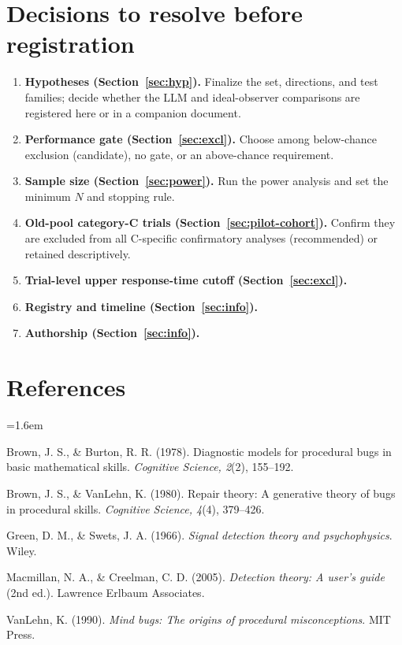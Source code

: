 \documentclass[11pt]{article}
\begin{document}
\section{Decisions to resolve before registration}\label{sec:decisions}

\begin{tcolorbox}[colback=decisioncol!5,colframe=decisioncol!55,boxrule=0.8pt,
  left=10pt,right=10pt,top=8pt,bottom=8pt]
\small
\begin{enumerate}[leftmargin=1.5em,label=\arabic*.]
\item \textbf{Hypotheses (Section~\ref{sec:hyp}).} Finalize the set, directions, and test
families; decide whether the LLM and ideal-observer comparisons are registered here or in a
companion document.
\item \textbf{Performance gate (Section~\ref{sec:excl}).} Choose among below-chance exclusion
(candidate), no gate, or an above-chance requirement.
\item \textbf{Sample size (Section~\ref{sec:power}).} Run the power analysis and set the
minimum $N$ and stopping rule.
\item \textbf{Old-pool category-C trials (Section~\ref{sec:pilot-cohort}).} Confirm they are
excluded from all C-specific confirmatory analyses (recommended) or retained descriptively.
\item \textbf{Trial-level upper response-time cutoff (Section~\ref{sec:excl}).}
\item \textbf{Registry and timeline (Section~\ref{sec:info}).}
\item \textbf{Authorship (Section~\ref{sec:info}).}
\end{enumerate}
\end{tcolorbox}

\section*{References}
{\setlength{\parindent}{-1.6em}\leftskip=1.6em\small

Brown, J. S., \& Burton, R. R. (1978). Diagnostic models for procedural bugs in basic
mathematical skills. \textit{Cognitive Science, 2}(2), 155--192.\par\smallskip

Brown, J. S., \& VanLehn, K. (1980). Repair theory: A generative theory of bugs in procedural
skills. \textit{Cognitive Science, 4}(4), 379--426.\par\smallskip

Green, D. M., \& Swets, J. A. (1966). \textit{Signal detection theory and psychophysics}.
Wiley.\par\smallskip

Macmillan, N. A., \& Creelman, C. D. (2005). \textit{Detection theory: A user's guide} (2nd
ed.). Lawrence Erlbaum Associates.\par\smallskip

VanLehn, K. (1990). \textit{Mind bugs: The origins of procedural misconceptions}. MIT
Press.\par

}
\end{document}
